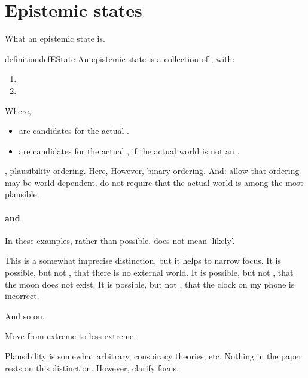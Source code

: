 \section{Epistemic states}
\label{sec:epistemic-states}

\begin{note}
  What an epistemic state is.
\end{note}

\begin{note}
  \begin{restatable}{definition}{defEState}
    An epistemic state is a collection of , with:
    \begin{enumerate}
    \item {}
    \item {}
    \end{enumerate}
    Where,
    \begin{itemize}
    \item {} are candidates for the actual \world{}.
    \item {} are candidates for the actual \world{}, if the actual world is not an .
    \end{itemize}
  \end{restatable}
\end{note}

\begin{note}
  , plausibility ordering.
  Here,
  However, binary ordering.
  And:
  allow that ordering may be world dependent.
  do not require that the actual world is among the most plausible.
\end{note}

\paragraph{ and }

\begin{note}
  In these examples,  rather than possible.
   does not mean `likely'.

  This is a somewhat imprecise distinction, but it helps to narrow focus.
  It is possible, but not , that there is no external world.
  It is possible, but not , that the moon does not exist.
  It is possible, but not , that the clock on my phone is incorrect.

  And so on.

  Move from extreme to less extreme.

  Plausibility is somewhat arbitrary, conspiracy theories, etc.
  Nothing in the paper rests on this distinction.
  However, clarify focus.
\end{note}

